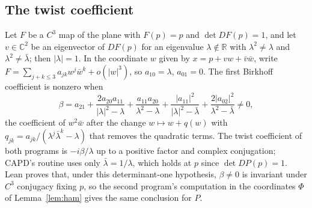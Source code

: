 \documentclass[11pt]{article}
\theoremstyle{definition}
\theoremstyle{remark}
\newcommand{\R}{\mathbb{R}}
\newcommand{\C}{\mathbb{C}}
\begin{document}
\begin{appendices}
\section{The twist coefficient}\label{app:twist}
Let $F$ be a $C^3$ map of the plane with $F(p)=p$ and $\det DF(p)=1$, and let $v\in\C^2$ be an
eigenvector of $DF(p)$ for an eigenvalue $\lambda\notin\R$ with
$\lambda^2\ne\lambda$ and $\lambda^2\ne\bar\lambda$; then $|\lambda|=1$. In the coordinate $w$
given by $x=p+vw+\bar v\bar w$, write
$F=\sum_{j+k\le3}a_{jk}w^j\bar w^k+o(|w|^3)$, so $a_{10}=\lambda$,
$a_{01}=0$. The first Birkhoff coefficient is nonzero when
\[
\beta=a_{21}+\frac{2a_{20}a_{11}}{|\lambda|^2-\lambda}+\frac{a_{11}a_{20}}{\lambda^2-\lambda}
+\frac{|a_{11}|^2}{|\lambda|^2-\bar\lambda}+\frac{2|a_{02}|^2}{\lambda^2-\bar\lambda}\ne0,
\]
the coefficient of $w^2\bar w$ after the change $w\mapsto w+q(w)$ with
$q_{jk}=a_{jk}/(\lambda^j\bar\lambda^k-\lambda)$ that removes the quadratic
terms. The twist coefficient of both programs is $-i\beta/\lambda$ up to a
positive factor and complex conjugation; CAPD's routine uses only
$\bar\lambda=1/\lambda$, which holds at $p$ since $\det DP(p)=1$. Lean proves
that, under this determinant-one hypothesis, $\beta\ne0$ is invariant under
$C^3$ conjugacy fixing $p$, so the second
program's computation in the coordinates $\Phi$ of Lemma~\ref{lem:ham} gives
the same conclusion for $P$.


\end{appendices}
\end{document}
